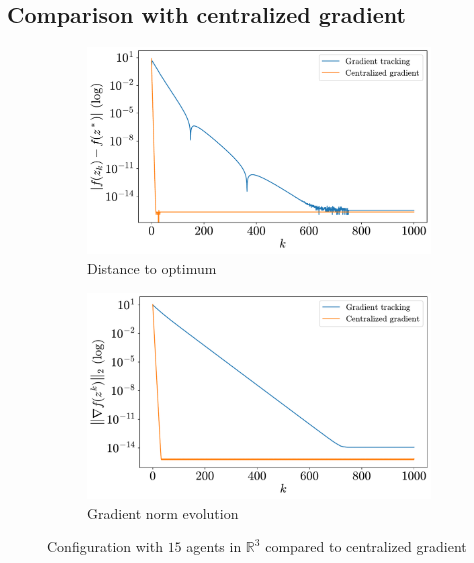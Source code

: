 \documentclass[a4paper,11pt,oneside]{book}
\begin{document}
\subsection{Comparison with centralized gradient}

\begin{figure}[H]
      \centering
      \begin{subfigure}[t]{0.49\textwidth}
            \centering
            \includegraphics[width=\linewidth]{./figs/quadratic/distance_centralized_15_3_1000.pdf} 
            \caption{Distance to optimum}
      \end{subfigure}
      \hfill
      \begin{subfigure}[t]{0.49\textwidth}
            \centering
            \includegraphics[width=\linewidth]{./figs/quadratic/gradient_centralized_15_3_1000.pdf} 
            \caption{Gradient norm evolution}
      \end{subfigure}
      \caption{Configuration with $15$ agents in $\mathbb{R}^{3}$ compared to centralized gradient}
\end{figure}
\end{document}
